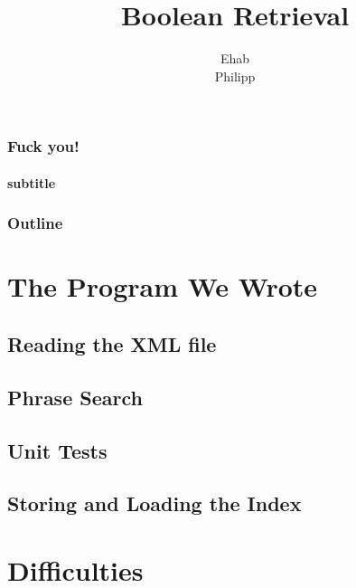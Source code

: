 \documentclass{beamer}
\title{Boolean Retrieval}
\author{Ehab\\ Philipp}
\begin{document}
\begin{frame}

  \frametitle{Fuck you!}
  \framesubtitle{subtitle}

\end{frame}

\begin{frame}

  \frametitle{Outline}
  \tableofcontents[pausesections]
\end{frame}

\section{The Program We Wrote}


\subsection{Reading the XML file}

\begin{frame}
  
\end{frame}

\subsection{Phrase Search}

\begin{frame}

\end{frame}

\subsection{Unit Tests}

\begin{frame}

\end{frame}

\subsection{Storing and Loading the Index}

\section{Difficulties}


\end{document}
